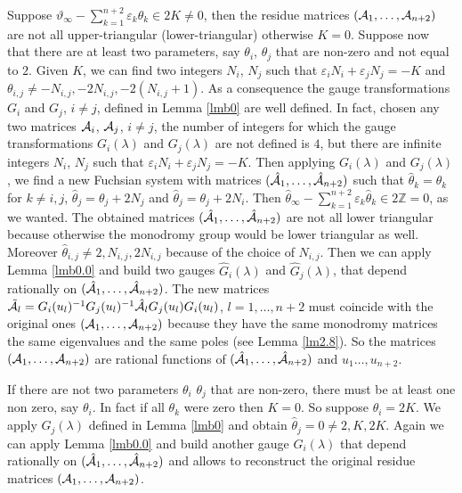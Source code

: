 \documentclass[12pt]{article}
\def\thi{{\vartheta_\infty}}
\def\eps{\varepsilon}
\newcommand {\interi}{\mathbb Z}
\theoremstyle{definition}
\theoremstyle{theorem}
\begin{document}
Suppose $\thi-\sum_{k=1}^{n+2}\eps_k\theta_k\in 2K\neq0$, then 
the residue matrices $({\cal A}_1,\dots,{\cal A}_{n+2})$ are not all 
upper-triangular (lower-triangular) otherwise $K=0$. Suppose now 
that there are at least two parameters, say $\theta_i$, $\theta_j$ 
that are non-zero and not equal to $2$. Given $K$, we can find two 
integers $N_i$, $N_j$ 
such that $\eps_i N_i+\eps_j N_j=-K$ and 
$\theta_{i,j}\neq -N_{i,j},-2 N_{i,j}, -2 (N_{i,j}+1)$. As a 
consequence the gauge transformations 
$G_i$ and $G_j$, $i\neq j$, defined in Lemma \ref{lmb0} are well defined. 
In fact, chosen any two matrices ${\cal A}_i$, ${\cal A}_j$, 
$i\neq j$, the number of integers for which the gauge transformations 
$G_i(\lambda)$ and $G_j(\lambda)$ are not defined is $4$, but there 
are infinite integers $N_i$, $N_j$ such that $\eps_i N_i+\eps_j N_j=-K$.
Then applying $G_i(\lambda)$ and $G_j(\lambda)$, we find a new
Fuchsian system
with matrices $(\hat{\cal A}_1,\dots,\hat{\cal A}_{n+2})$ 
such that $\hat\theta_k=\theta_k$ for $k\neq i,j$,  
$\hat\theta_j=\theta_j+2N_j$ and $\hat\theta_j=\theta_j+2N_i$. 
Then $\hat{\theta}_\infty-\sum_{k=1}^{n+2}\eps_k\hat\theta_k\in2\interi=0$,
as we wanted. The obtained matrices
$(\hat{\cal A}_1,\dots,\hat{\cal A}_{n+2})$ are not all lower triangular 
because otherwise the monodromy group would be lower triangular as 
well. Moreover $\hat\theta_{i,j}\neq 2, N_{i,j}, 2 N_{i,j}$ because 
of the choice of $N_{i,j}$.
Then we can apply Lemma \ref{lmb0.0} and build two gauges 
$\hat G_i(\lambda)$ and $\hat G_j(\lambda)$, that depend rationally on 
$(\hat{\cal A}_1,\dots,\hat{\cal A}_{n+2})$. The new matrices
$\tilde{\cal A}_l=G_i(u_l)^{-1}G_j(u_l)^{-1}\hat{\cal A}_l
G_j(u_l)G_i(u_l)$, $l=1,\dots,n+2$ must coincide with the original 
ones $({\cal A}_1,\dots,{\cal A}_{n+2})$ because they have the same 
monodromy matrices the same eigenvalues and the same poles (see Lemma 
\ref{lm2.8}). So the matrices
$({\cal A}_1,\dots,{\cal A}_{n+2})$ are rational functions of
$(\hat{\cal A}_1,\dots,\hat{\cal A}_{n+2})$ and $u_1\dots,u_{n+2}$.

If there are not two parameters $\theta_i$ $\theta_j$ that are 
non-zero, there must be at
least one non zero, say $\theta_i$. In fact if all $\theta_k$ were 
zero then $K=0$. So suppose $\theta_i=2 K$. We apply 
$G_j(\lambda)$ defined in Lemma \ref{lmb0} and obtain 
$\hat\theta_j=0\neq 2,K,2K$. Again we can apply Lemma \ref{lmb0.0} 
and build another gauge $\hat G_i(\lambda)$ that depend rationally on 
$(\hat{\cal A}_1,\dots,\hat{\cal A}_{n+2})$ and allows to reconstruct
the original residue matrices $({\cal A}_1,\dots,{\cal A}_{n+2})$. 
\end{document}
